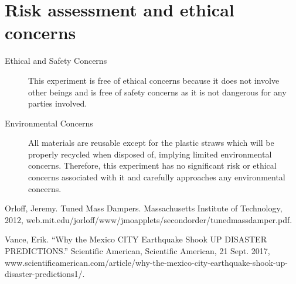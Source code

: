 \documentclass[11pt]{article}
\begin{document}
\section{Risk assessment and ethical concerns}
\begin{description}
    \item[Ethical and Safety Concerns] This experiment is free of ethical concerns because it does not involve other beings and is free of safety concerns as it is not dangerous for any parties involved.
    \item[Environmental Concerns] All materials are reusable except for the plastic straws which will be properly recycled when disposed of, implying limited environmental concerns. Therefore, this experiment has no significant risk or ethical concerns associated with it and carefully approaches any environmental concerns.
\end{description}





\newpage

\begin{thebibliography}{1}

 Orloff, Jeremy. Tuned Mass Dampers. Massachusetts Institute of Technology, 2012, web.mit.edu/jorloff/www/jmoapplets/secondorder/tunedmassdamper.pdf.

 Vance, Erik. “Why the Mexico CITY Earthquake Shook UP DISASTER PREDICTIONS.” Scientific American, Scientific American, 21 Sept. 2017, www.scientificamerican.com/article/why-the-mexico-city-earthquake-shook-up-disaster-predictions1/.

\end{thebibliography}
\end{document}
